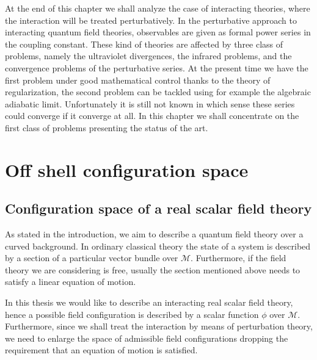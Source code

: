 \documentclass[11pt]{book}
\newcommand{\Mcal}{\mathcal{M}}
\theoremstyle{break}
\begin{document}
At the end of this chapter we shall analyze the case of interacting theories, where the interaction will be treated perturbatively. In the perturbative approach to interacting quantum field theories, observables are given as formal power series in the coupling constant. These kind of theories are affected by three class of problems, namely the ultraviolet divergences, the infrared problems, and the convergence problems of the perturbative series. At the present time we have the first problem under good mathematical control thanks to the theory of regularization, the second problem can be tackled using for example the algebraic adiabatic limit. Unfortunately it is still not known in which sense these series could converge if it converge at all. In this chapter we shall concentrate on the first class of problems presenting the status of the art.


\section{Off shell configuration space}
\label{p:OFF_SHELL_CONFIG_SPACE}


\subsection{Configuration space of a real scalar field theory}
\label{p:DEF_CONFIG_SPACE}


As stated in the introduction, we aim to describe a quantum field theory over a curved background. In ordinary classical theory the state of a system is described by a section of a particular vector bundle over $\Mcal$. Furthermore, if the field theory we are considering is free, usually the section mentioned above needs to satisfy a linear equation of motion.


In this thesis we would like to describe an interacting real scalar field theory, hence a possible field configuration is described by a scalar function $\phi$ over $\Mcal$. Furthermore, since we shall treat the interaction by means of perturbation theory, we need to enlarge the space of admissible field configurations dropping the requirement that an equation of motion is satisfied.
\end{document}

